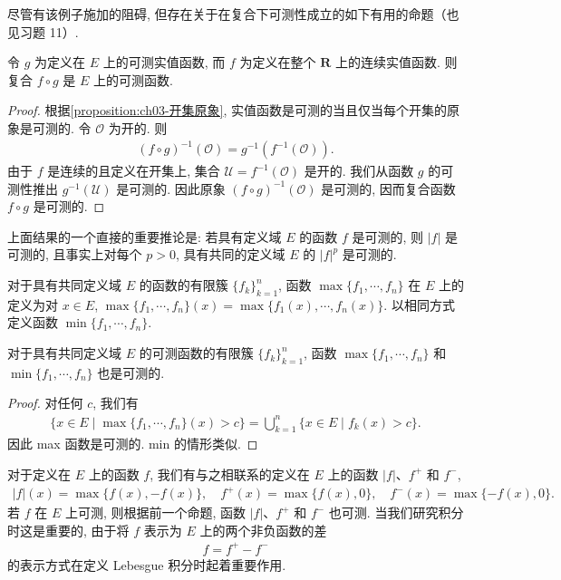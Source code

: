 \documentclass[../../main.tex]{subfiles}
\begin{document}
尽管有该例子施加的阻碍, 但存在关于在复合下可测性成立的如下有用的命题（也见习题 11）.

\begin{proposition}\label{proposition:ch03-外复合可测}
令 $g$ 为定义在 $E$ 上的可测实值函数, 而 $f$ 为定义在整个 $\mathbf{R}$ 上的连续实值函数. 则复合 $f\circ g$ 是 $E$ 上的可测函数.
\end{proposition}

\begin{proof}
根据\cref{proposition:ch03-开集原象}, 实值函数是可测的当且仅当每个开集的原象是可测的. 令 $\mathcal{O}$ 为开的. 则
\begin{align*}
(f\circ g)^{-1}(\mathcal{O})=g^{-1}(f^{-1}(\mathcal{O})).
\end{align*}
由于 $f$ 是连续的且定义在开集上, 集合 $\mathcal{U}=f^{-1}(\mathcal{O})$ 是开的. 我们从函数 $g$ 的可测性推出 $g^{-1}(\mathcal{U})$ 是可测的. 因此原象 $(f\circ g)^{-1}(\mathcal{O})$ 是可测的, 因而复合函数 $f\circ g$ 是可测的.
\end{proof}

上面结果的一个直接的重要推论是: 若具有定义域 $E$ 的函数 $f$ 是可测的, 则 $|f|$ 是可测的, 且事实上对每个 $p>0$, 具有共同的定义域 $E$ 的 $|f|^{p}$ 是可测的.

对于具有共同定义域 $E$ 的函数的有限簇 $\{f_{k}\}_{k=1}^{n}$, 函数 $\max\{f_{1},\cdots,f_{n}\}$ 在 $E$ 上的定义为对 $x\in E$, $\max\{f_{1},\cdots,f_{n}\}(x)=\max\{f_{1}(x),\cdots,f_{n}(x)\}$. 以相同方式定义函数 $\min\{f_{1},\cdots,f_{n}\}$.

\begin{proposition}\label{proposition:ch03-maxmin可测}
对于具有共同定义域 $E$ 的可测函数的有限簇 $\{f_{k}\}_{k=1}^{n}$, 函数 $\max\{f_{1},\cdots,f_{n}\}$ 和 $\min\{f_{1},\cdots,f_{n}\}$ 也是可测的.
\end{proposition}

\begin{proof}
对任何 $c$, 我们有
\begin{align*}
\{x\in E\mid\max\{f_{1},\cdots,f_{n}\}(x)>c\}=\bigcup_{k=1}^{n}\{x\in E\mid f_{k}(x)>c\}.
\end{align*}
因此 max 函数是可测的. min 的情形类似.
\end{proof}


对于定义在 $E$ 上的函数 $f$, 我们有与之相联系的定义在 $E$ 上的函数 $|f|$、$f^{+}$ 和 $f^{-}$,
\begin{align*}
|f|(x)=\max\{f(x),-f(x)\},\quad f^{+}(x)=\max\{f(x),0\},\quad f^{-}(x)=\max\{-f(x),0\}.
\end{align*}
若 $f$ 在 $E$ 上可测, 则根据前一个命题, 函数 $|f|$、$f^{+}$ 和 $f^{-}$ 也可测. 当我们研究积分时这是重要的, 由于将 $f$ 表示为 $E$ 上的两个非负函数的差
\begin{align*}
f=f^{+}-f^{-}
\end{align*}
的表示方式在定义 Lebesgue 积分时起着重要作用.
\end{document}
